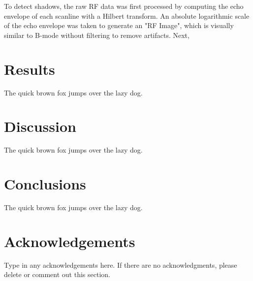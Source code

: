 \documentclass[preprint,5p]{elsarticle}
\begin{document}
To detect shadows, the raw RF data was first processed by computing the echo envelope of each scanline with a Hilbert transform. An absolute logarithmic scale of the echo envelope was taken to generate an "RF Image", which is visually similar to B-mode without filtering to remove artifacts. Next,



\section*{Results}
\label{Results}
The quick brown fox jumps over the lazy dog.

\section*{Discussion}
\label{Discuss}
The quick brown fox jumps over the lazy dog.

\section*{Conclusions}
\label{Conclusions}
The quick brown fox jumps over the lazy dog.

        
\section*{Acknowledgements}
\label{Ack}
Type in any acknowledgements here.  If there are no acknowledgments, please delete or comment out this section.







\end{document}
